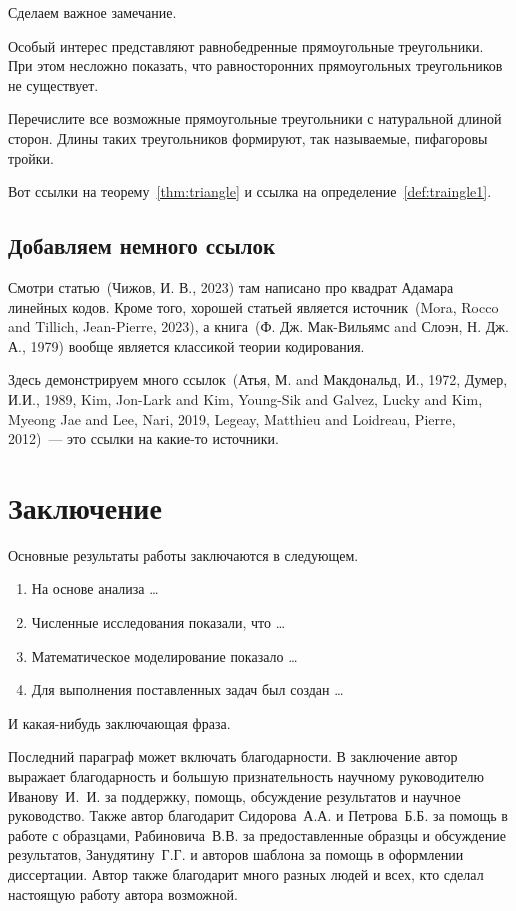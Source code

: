 \documentclass[12pt]{extarticle}
\begin{document}
Сделаем важное замечание.

\begin{remark}\label{rem:traingle}
Особый интерес представляют равнобедренные прямоугольные треугольники.
При этом несложно показать, что равносторонних прямоугольных треугольников не существует.
\end{remark}

\begin{problem}
Перечислите все возможные прямоугольные треугольники с натуральной длиной сторон.
Длины таких треугольников формируют, так называемые, пифагоровы тройки.
\label{prob:triangle}
\end{problem}

Вот ссылки на теорему~\ref{thm:triangle} и ссылка на определение~\ref{def:traingle1}.
\subsection{Добавляем немного ссылок}
\label{sec:orgc71c7ee}

Смотри статью~(Чижов, И. В., 2023) там написано про квадрат Адамара линейных кодов.
Кроме того, хорошей статьей является источник~(Mora, Rocco and Tillich, Jean-Pierre, 2023), а книга~({Ф. Дж. Мак-Вильямс} and Слоэн, Н. {\relax Дж}. А., 1979) вообще является классикой теории кодирования.

Здесь демонстрируем много ссылок~(Атья, М. and Макдональд, И., 1972, Думер, И.И., 1989, Kim, Jon-Lark and Kim, Young-Sik and Galvez, Lucky and Kim, Myeong Jae and Lee, Nari, 2019, Legeay, Matthieu and Loidreau, Pierre, 2012)~--- это ссылки на какие-то источники.
\section*{Заключение}
\label{sec:org211b4b3}

Основные результаты работы заключаются в следующем.
\begin{enumerate}
\item На основе анализа \ldots
\item Численные исследования показали, что \ldots
\item Математическое моделирование показало \ldots
\item Для выполнения поставленных задач был создан \ldots
\end{enumerate}
И какая-нибудь заключающая фраза.

Последний параграф может включать благодарности.
В заключение автор выражает благодарность и большую признательность научному руководителю Иванову~И.~И. за поддержку, помощь, обсуждение результатов и научное руководство.
Также автор благодарит Сидорова~А.А. и Петрова~Б.Б.
за помощь в работе с образцами, Рабиновича~В.В. за предоставленные образцы и обсуждение результатов, Занудятину~Г.Г. и авторов шаблона за помощь в оформлении
диссертации.
Автор также благодарит много разных людей и всех, кто сделал настоящую работу автора возможной.
\clearpage
\listoftables
{}
\appendix
\end{document}
